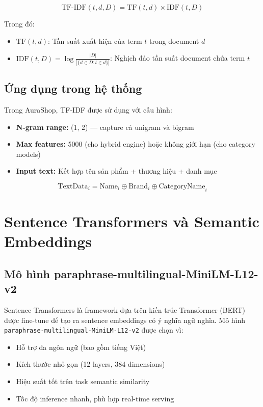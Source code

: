 \documentclass[12pt,a4paper]{report}
\begin{document}
\begin{equation}
\text{TF-IDF}(t, d, D) = \text{TF}(t, d) \times \text{IDF}(t, D)
\end{equation}

Trong đó:
\begin{itemize}
    \item $\text{TF}(t, d)$: Tần suất xuất hiện của term $t$ trong document $d$
    \item $\text{IDF}(t, D) = \log\frac{|D|}{|\{d \in D : t \in d\}|}$: Nghịch đảo tần suất document chứa term $t$
\end{itemize}

\subsection{Ứng dụng trong hệ thống}

Trong AuraShop, TF-IDF được sử dụng với cấu hình:
\begin{itemize}
    \item \textbf{N-gram range:} (1, 2) — capture cả unigram và bigram
    \item \textbf{Max features:} 5000 (cho hybrid engine) hoặc không giới hạn (cho category models)
    \item \textbf{Input text:} Kết hợp tên sản phẩm + thương hiệu + danh mục
\end{itemize}

\begin{equation}
\text{TextData}_i = \text{Name}_i \oplus \text{Brand}_i \oplus \text{CategoryName}_i
\end{equation}

\section{Sentence Transformers và Semantic Embeddings}

\subsection{Mô hình paraphrase-multilingual-MiniLM-L12-v2}

Sentence Transformers là framework dựa trên kiến trúc Transformer (BERT) được fine-tune để tạo ra sentence embeddings có ý nghĩa ngữ nghĩa. Mô hình \texttt{paraphrase-multilingual-MiniLM-L12-v2} được chọn vì:

\begin{itemize}
    \item Hỗ trợ đa ngôn ngữ (bao gồm tiếng Việt)
    \item Kích thước nhỏ gọn (12 layers, 384 dimensions)
    \item Hiệu suất tốt trên task semantic similarity
    \item Tốc độ inference nhanh, phù hợp real-time serving
\end{itemize}
\end{document}
